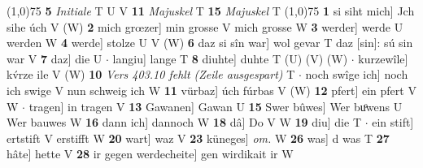 \documentclass[8pt,a4paper,notitlepage]{article}
\begin{document}
\begin{table}[ht]
\begin{minipage}[t]{0.5\linewidth}
\line(1,0){75} \newline
\textbf{5} \textit{Initiale} T U V  \textbf{11} \textit{Majuskel} T  \textbf{15} \textit{Majuskel} T  \newline
\line(1,0){75} \newline
\textbf{1} si siht mich] Jch sihe úch V (W) \textbf{2} mich grœzer] min grosse V mich grosse W \textbf{3} werder] werde U werden W \textbf{4} werde] stolze U V (W) \textbf{6} daz si sîn war] wol gevar T daz [sin]: sú sin war V \textbf{7} daz] die U  $\cdot$ langiu] lange T \textbf{8} diuhte] duhte T (U) (V) (W)  $\cdot$ kurzewîle] kv́rze ile V (W) \textbf{10} \textit{Vers 403.10 fehlt (Zeile ausgespart)} T   $\cdot$ noch swîge ich] noch ich swige V nun schweig ich W \textbf{11} vürbaz] úch fúrbas V (W) \textbf{12} pfert] ein pfert V W  $\cdot$ tragen] in tragen V \textbf{13} Gawanen] Gawan U \textbf{15} Swer bûwes] Wer buͦwens U Wer bauwes W \textbf{16} dann ich] dannoch W \textbf{18} dâ] Do V W \textbf{19} diu] die T  $\cdot$ ein stift] ertstift V erstifft W \textbf{20} wart] waz V \textbf{23} küneges] \textit{om.} W \textbf{26} was] d was T \textbf{27} hâte] hette V \textbf{28} ir gegen werdecheite] gen wirdikait ir W \newline
\end{minipage}
\end{table}
\end{document}
